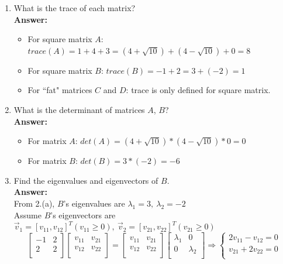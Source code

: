 \documentclass[letterpaper,11pt]{article}
\begin{document}
\begin{enumerate}
\begin{enumerate}
	\item What is the trace of each matrix?\\
	\textbf{Answer:}
	\begin{itemize}
		\item For square matrix $A$: $trace(A)=1+4+3=(4+\sqrt{10})+(4-\sqrt{10})+0=8$
		\item For square matrix $B$: $trace(B)=-1+2=3+(-2)=1$
		\item For ``fat" matrices $C$ and $D$: trace is only defined for square matrix.
	\end{itemize}
	\item What is the determinant of matrices $A$, $B$?\\
	\textbf{Answer:}
	\begin{itemize}
		\item For matrix $A$: $det(A)=(4+\sqrt{10})*(4-\sqrt{10})*0=0$
		\item For matrix $B$: $det(B)=3*(-2)=-6$
	\end{itemize}
	\item Find the eigenvalues and eigenvectors of $B$.\\
	\textbf{Answer:}\\
	From 2.(a), $B$'s eigenvalues are $\lambda_1=3,~\lambda_2=-2$\\
	Assume $B$'s eigenvectors are $\vec{v}_1=[v_{11},v_{12}]^T (v_{11} \geq 0),~\vec{v}_2=[v_{21},v_{22}]^T (v_{21} \geq 0)$
	$$\left[\begin{array}{cc}
	-1 & 2 \\
	2 & 2 \\
	\end{array}\right] \left[\begin{array}{cc}
	v_{11} & v_{21} \\
	v_{12} & v_{22} \\
	\end{array}\right] = \left[\begin{array}{cc}
	v_{11} & v_{21} \\
	v_{12} & v_{22} \\
	\end{array}\right] \left[\begin{array}{cc}
	\lambda_1 & 0 \\
	0 & \lambda_2 \\
	\end{array}\right] \Rightarrow \left\{\begin{array}{c}
	2v_{11}-v_{12}=0 \\
	v_{21}+2v_{22}=0 \\

\end{array}$$
\end{enumerate}
\end{enumerate}
\end{document}
